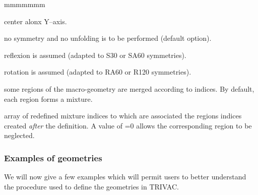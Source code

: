 \begin{ListeDeDescription}{mmmmmmm}
\item[\dusa{y0}] center alonx Y--axis.

\item[\moc{NONE}] no symmetry and no unfolding is to be performed (default option).

\item[\moc{REFL}] reflexion is assumed (adapted to S30 or SA60 symmetries).

\item[\moc{ROTA}] rotation is assumed (adapted to RA60 or R120 symmetries).

\item[\moc{REMIX}] some regions of the macro-geometry are merged according to  indices. By default, each region forms a mixture.

\item[\dusa{imix2}] array of redefined mixture indices to which are associated the regions indices created {\sl after} the  definition. A value of =0 allows the corresponding region to be neglected.

\end{ListeDeDescription}

\vskip 0.2cm

\subsubsection{Examples of geometries}

We will now give a few examples which will permit users to better understand the procedure used to define the geometries in TRIVAC.


